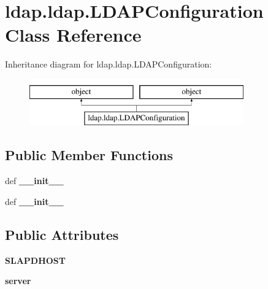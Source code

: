 \hypertarget{classldap_1_1ldap_1_1LDAPConfiguration}{\section{ldap.\-ldap.\-L\-D\-A\-P\-Configuration Class Reference}
\label{classldap_1_1ldap_1_1LDAPConfiguration}
}
Inheritance diagram for ldap.\-ldap.\-L\-D\-A\-P\-Configuration\-:\begin{figure}[H]
\begin{center}
\leavevmode
\includegraphics[height=2.000000cm]{classldap_1_1ldap_1_1LDAPConfiguration}
\end{center}
\end{figure}
\subsection*{Public Member Functions}
\begin{DoxyCompactItemize}
\item 
\hypertarget{classldap_1_1ldap_1_1LDAPConfiguration_a8402c008a22021c6d8c300fbb84515b4}{def {\bfseries \-\_\-\-\_\-init\-\_\-\-\_\-}}\label{classldap_1_1ldap_1_1LDAPConfiguration_a8402c008a22021c6d8c300fbb84515b4}

\item 
\hypertarget{classldap_1_1ldap_1_1LDAPConfiguration_a8402c008a22021c6d8c300fbb84515b4}{def {\bfseries \-\_\-\-\_\-init\-\_\-\-\_\-}}\label{classldap_1_1ldap_1_1LDAPConfiguration_a8402c008a22021c6d8c300fbb84515b4}

\end{DoxyCompactItemize}
\subsection*{Public Attributes}
\begin{DoxyCompactItemize}
\item 
\hypertarget{classldap_1_1ldap_1_1LDAPConfiguration_aaf42a56c4cc906ef054c6330e792edfb}{{\bfseries S\-L\-A\-P\-D\-H\-O\-S\-T}}\label{classldap_1_1ldap_1_1LDAPConfiguration_aaf42a56c4cc906ef054c6330e792edfb}

\item 
\hypertarget{classldap_1_1ldap_1_1LDAPConfiguration_ad2f5d28dbacb48734bc80310057f7125}{{\bfseries server}}\label{classldap_1_1ldap_1_1LDAPConfiguration_ad2f5d28dbacb48734bc80310057f7125}

\end{DoxyCompactItemize}
